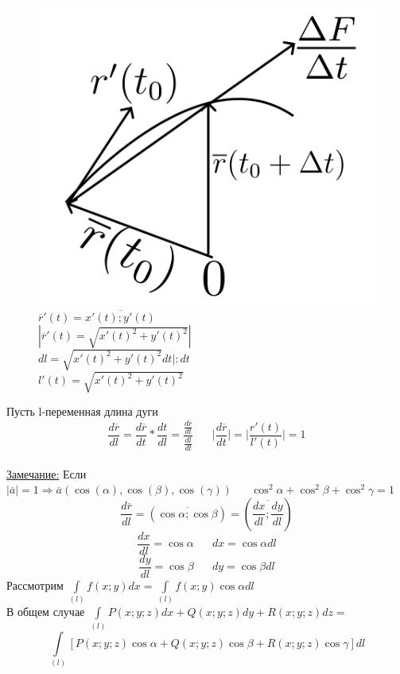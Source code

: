 \documentclass[12pt]{article}
\let\ORIincludegraphics\includegraphics
\renewcommand{\includegraphics}[2][]{\ORIincludegraphics[scale=0.65,#1]{#2}}
\let\oldint\int
\renewcommand{\int}{\oldint\limits}
\begin{document}
\begin{figure}[h!]
\begin{minipage}{0.45\textwidth}
        \includegraphics[width=\textwidth]{8.6.2.png} %
        \vspace{0.5em} %
        $\overline{r}'(t)=\overline{x'(t);y'(t)}$\\
        $|\overline{r}'(t)=\sqrt{x'(t)^2+y'(t)^2}|$\\
        $dl=\sqrt{x'(t)^2+y'(t)^2}dt|:dt$\\
        $l'(t)=\sqrt{x'(t)^2+y'(t)^2}$
    \end{minipage}
  \end{figure}
  \par
  Пусть l-переменная длина дуги\\
  \[\frac{d \overline{r}}{dl} = \frac{d \overline{r}}{dt}* \frac{dt}{dl}=\frac{\frac{d \overline{r}}{dt}}{\frac{dl}{dt}}
  \hspace{20pt} \Big| \frac{d \overline{r}}{dt} \Big| = \Big| \frac{r'(t)}{l'(t)} \Big| = 1\]\\
  \underline{Замечание:} Если $|\overline{a}|=1 \Rightarrow \overline{a}(\cos(\alpha),\cos(\beta),\cos(\gamma))
  \hspace{20pt} \cos^2 \alpha+\cos^2 \beta+\cos^2 \gamma=1$\\
  \[\frac{d \overline{r}}{dl}=(\overline{\cos \alpha; \cos \beta})=(\overline{\frac{dx}{dl};\frac{dy}{dl}})\]
  \[\frac{dx}{dl}=\cos \alpha \hspace{20pt} dx=\cos \alpha dl\]
  \[\frac{dy}{dl}=\cos \beta \hspace{20pt} dy=\cos \beta dl\]
  Рассмотрим $\int_{(l)}f(x;y)dx=\int_{(l)}f(x;y)\cos \alpha dl$\\
  В общем случае $\int_{(l)}P(x;y;z)dx+Q(x;y;z)dy+R(x;y;z)dz=$\\
  \[\int_{(l)} [P(x;y;z)\cos \alpha + Q(x;y;z)\cos \beta + R(x;y;z)\cos \gamma]dl\]
\end{document}
